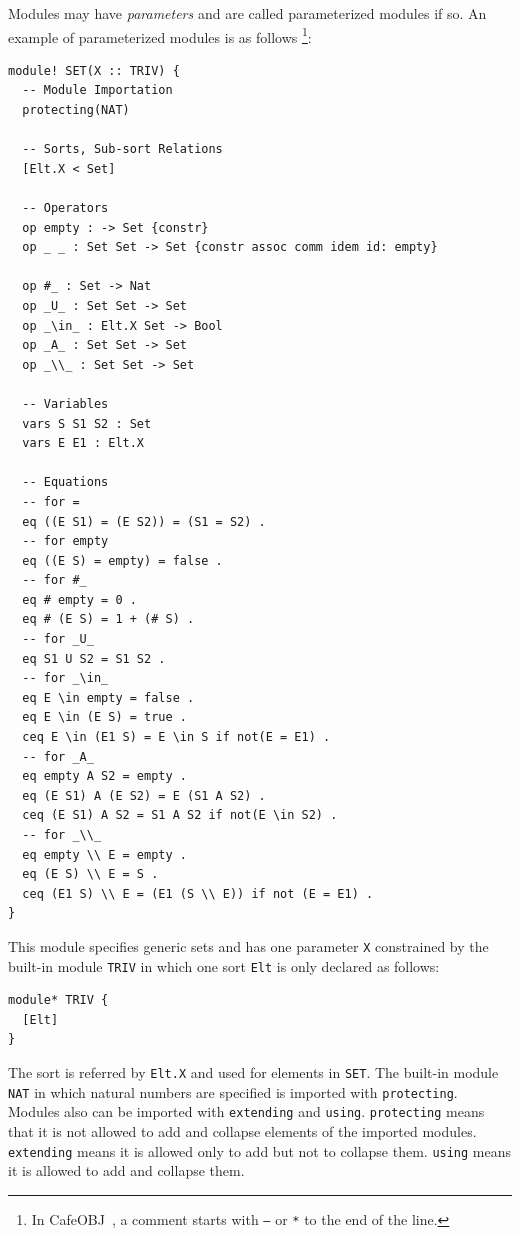 \documentclass[12pt]{report}
\newcommand{\cafeobj}{{\sf CafeOBJ}~}
\begin{document}
Modules may have {\it parameters} and are called parameterized modules
if so. An example of parameterized modules is as follows
\footnote{In \cafeobj, a comment starts with {\tt --} or {\tt **} to
  the end of the line.}:
\begin{verbatim}
module! SET(X :: TRIV) {
  -- Module Importation
  protecting(NAT)

  -- Sorts, Sub-sort Relations
  [Elt.X < Set]

  -- Operators
  op empty : -> Set {constr}
  op _ _ : Set Set -> Set {constr assoc comm idem id: empty}

  op #_ : Set -> Nat
  op _U_ : Set Set -> Set
  op _\in_ : Elt.X Set -> Bool
  op _A_ : Set Set -> Set
  op _\\_ : Set Set -> Set

  -- Variables
  vars S S1 S2 : Set
  vars E E1 : Elt.X

  -- Equations
  -- for =
  eq ((E S1) = (E S2)) = (S1 = S2) .
  -- for empty
  eq ((E S) = empty) = false .
  -- for #_
  eq # empty = 0 .   
  eq # (E S) = 1 + (# S) . 
  -- for _U_
  eq S1 U S2 = S1 S2 .
  -- for _\in_
  eq E \in empty = false .
  eq E \in (E S) = true .
  ceq E \in (E1 S) = E \in S if not(E = E1) .
  -- for _A_
  eq empty A S2 = empty .
  eq (E S1) A (E S2) = E (S1 A S2) .
  ceq (E S1) A S2 = S1 A S2 if not(E \in S2) .
  -- for _\\_ 
  eq empty \\ E = empty .
  eq (E S) \\ E = S .
  ceq (E1 S) \\ E = (E1 (S \\ E)) if not (E = E1) .
}
\end{verbatim}
This module specifies generic sets and has one parameter {\tt X}
constrained by the built-in module {\tt TRIV} in which one sort
{\tt Elt} is only declared as follows:
\begin{verbatim}
module* TRIV {
  [Elt]
}
\end{verbatim}
The sort is referred by {\tt Elt.X} and used for elements in
{\tt SET}. The built-in module {\tt NAT} in which natural numbers are
specified is imported with {\tt protecting}. Modules also can be
imported with {\tt extending} and {\tt using}. {\tt protecting} means
that it is not allowed to add and collapse elements of the imported
modules.  {\tt extending} means it is allowed only to add but not to
collapse them. {\tt using} means it is allowed to add and collapse
them.
\end{document}
